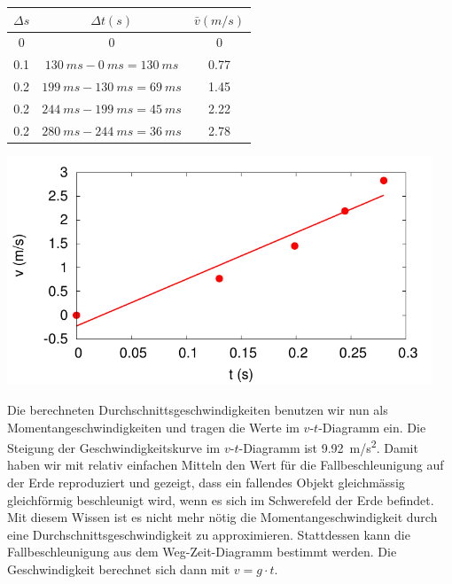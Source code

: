 \begin{minipage}{0.5\textwidth}
	\centering
	\begin{tabular}{ccc}
	$\Delta s$ &	$\Delta t (\si{s})$ & $\bar{v} (\si{m/s})$ \\\hline
0   & 0         & 0 \\
0.1 & $\SI{130}{ms} -\SI{0}{ms}=\SI{130}{ms}$  & 0.77 \\ 
0.2 & $\SI{199}{ms} -\SI{130}{ms}=\SI{69}{ms}$  & 1.45 \\ 
0.2 & $\SI{244}{ms} -\SI{199}{ms}=\SI{45}{ms}$  & 2.22 \\ 
0.2 & $\SI{280}{ms} -\SI{244}{ms}=\SI{36}{ms}$  & 2.78 \\ 
	\end{tabular}
\end{minipage}
\begin{minipage}{0.5\textwidth}
	\includegraphics[width=0.95\textwidth]{./freierfall_vt.pdf}
\end{minipage}

Die berechneten Durchschnittsgeschwindigkeiten benutzen wir nun als Momentangeschwindigkeiten und tragen 
die Werte im $v$-$t$-Diagramm ein. Die Steigung der Geschwindigkeitskurve im $v$-$t$-Diagramm ist
\SI{9.92}{m/s^2}. Damit haben wir mit relativ einfachen Mitteln den Wert für die Fallbeschleunigung 
auf der Erde reproduziert und gezeigt, dass ein fallendes Objekt gleichmässig gleichförmig beschleunigt
wird, wenn es sich im Schwerefeld der Erde befindet.
Mit diesem Wissen ist es nicht mehr nötig die Momentangeschwindigkeit durch eine Durchschnittsgeschwindigkeit
zu approximieren. Stattdessen kann die Fallbeschleunigung aus dem Weg-Zeit-Diagramm bestimmt werden. 
Die Geschwindigkeit berechnet sich dann mit $v=g\cdot t$.
